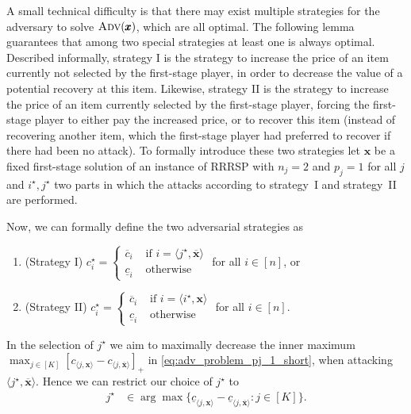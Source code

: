 \documentclass[a4paper,11pt,abstracton]{scrartcl}
\theoremstyle{definition}
\theoremstyle{remark}
\begin{document}
A small technical difficulty is that there may exist multiple strategies for the adversary to solve $\textsc{Adv}(\pmb{x})$, which are all optimal. The following lemma guarantees that among two special strategies at least one is always optimal. Described informally, strategy I is the strategy to increase the price of an item currently not selected by the first-stage player, in order to decrease the value of a potential recovery at this item. Likewise, strategy II is the strategy to increase the price of an item currently selected by the first-stage player, forcing the first-stage player to either pay the increased price, or to recover this item (instead of recovering another item, which the first-stage player had preferred to recover if there had been no attack).
To formally introduce these two strategies let $\pmb{x}$ be a fixed first-stage solution of an 
instance of RRRSP with $n_j=2$ and $p_j = 1$ for all $j$ and $i^\star, j^\star$ 
two parts in which the attacks according to strategy~I and strategy~II are performed.

Now, we can formally define the two adversarial strategies as
\begin{enumerate}
  \item (Strategy I) $c^\star_i = \begin{cases}
  \overline{c}_i & \text{ if } i = \langle j^\star,\overline{\pmb{x}}\rangle \\
  \underline{c}_i & \text{ otherwise } 
  \end{cases} $ for all $i\in [n]$, or
  
  \item (Strategy II) $c^\star_i = \begin{cases}
  \overline{c}_i & \text{ if } i = \langle i^\star, \pmb{x} \rangle \\
  \underline{c}_i & \text{ otherwise } 
  \end{cases} $ for all $i\in[n]$.
\end{enumerate}

In the selection of $j^\star$ we aim to maximally decrease the inner maximum 
$\max_{j\in[K]} [c_{\langle j, \pmb{x} \rangle} - c_{\langle j, \overline{\pmb{x}} \rangle}]_+$
in \cref{eq:adv_problem_pj_1_short}, when attacking $\langle j^\star,\overline{\pmb{x}}\rangle$.
Hence we can restrict our choice of $j^\star$ to
\begin{align}
  j^\star &\in \arg\max \{ \underline{c}_{\langle j, \pmb{x}\rangle} - \underline{c}_{\langle j, \overline{\pmb{x}} \rangle} : j\in[K] \}. \label{eq:jstar}
\end{align}
\end{document}
